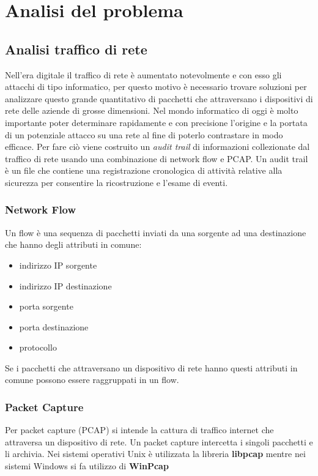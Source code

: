 \documentclass[../main.tex]{subfiles}
\begin{document}
\chapter{Analisi del problema}

\section{Analisi traffico di rete}

Nell'era digitale il traffico di rete è aumentato notevolmente e con esso gli attacchi di tipo informatico, per questo motivo è necessario trovare soluzioni per analizzare questo grande quantitativo di pacchetti che attraversano i dispositivi di rete delle aziende di grosse dimensioni. Nel mondo informatico di oggi è molto importante poter determinare rapidamente e con precisione l'origine e la portata di un potenziale attacco su una rete al fine di poterlo contrastare in modo efficace.
Per fare ciò viene costruito un \textit{audit trail} di informazioni collezionate dal traffico di rete usando una combinazione di network flow e PCAP. 
Un audit trail è un file che contiene una registrazione cronologica di attività relative alla sicurezza per consentire la ricostruzione e l'esame di eventi.

\subsection{Network Flow}
Un flow è una sequenza di pacchetti inviati da una sorgente ad una destinazione che hanno degli attributi in comune:
\begin{itemize}
				\item indirizzo IP sorgente
				\item indirizzo IP destinazione
				\item porta sorgente
				\item porta destinazione
				\item protocollo
\end{itemize}

Se i pacchetti che attraversano un dispositivo di rete hanno questi attributi in comune possono essere raggruppati in un flow.

\subsection{Packet Capture}
Per packet capture (PCAP) si intende la cattura di traffico internet che attraversa un dispositivo di rete. Un packet capture intercetta i singoli pacchetti e li archivia. Nei sistemi operativi Unix è utilizzata la libreria \textbf{libpcap} mentre nei sistemi Windows si fa utilizzo di \textbf{WinPcap}
\end{document}

